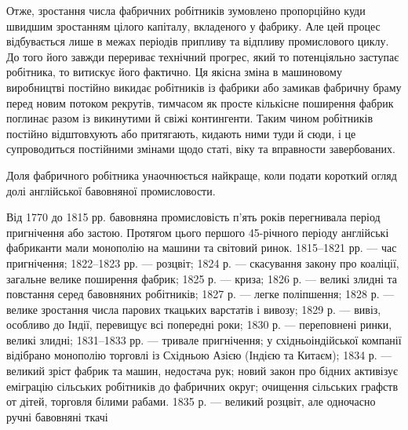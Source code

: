 Отже, зростання числа фабричних робітників зумовлено пропорційно
куди швидшим зростанням цілого капіталу, вкладеного
у фабрику. Але цей процес відбувається лише в межах періодів
припливу та відпливу промислового циклу. До того його завжди
перериває технічний прогрес, який то потенціяльно заступає робітника,
то витискує його фактично. Ця якісна зміна в машиновому
виробництві постійно викидає робітників із фабрики або замикав
фабричну браму перед новим потоком рекрутів, тимчасом як
просте кількісне поширення фабрик поглинає разом із викинутими
й свіжі контингенти. Таким чином робітників постійно відштовхують
або притягають, кидають ними туди й сюди, і це
супроводиться постійними змінами щодо статі, віку та вправности
завербованих.

Доля фабричного робітника унаочнюється найкраще, коли
подати короткий огляд долі англійської бавовняної промисловости.

Від 1770 до 1815 рр. бавовняна промисловість п’ять років перегнивала
період пригнічення або застою. Протягом цього першого
45-річного періоду англійські фабриканти мали монополію на
машини та світовий ринок. 1815--1821 рр. — час пригнічення;
1822--1823 рр. — розцвіт; 1824 р. — скасування закону про коаліції,
загальне велике поширення фабрик; 1825 р. — криза;
1826 р. — великі злидні та повстання серед бавовняних робітників;
1827 р. — легке поліпшення; 1828 р. — велике зростання
числа парових ткацьких варстатів і вивозу; 1829 р. — вивіз,
особливо до Індії, перевищує всі попередні роки; 1830 р. —
переповнені ринки, великі злидні; 1831--1833 рр. — тривале
пригнічення; у східньоіндійської компанії відібрано монополію
торговлі із Східньою Азією (Індією та Китаєм); 1834 р. — великий
зріст фабрик та машин, недостача рук; новий закон про бідних
активізує еміграцію сільських робітників до фабричних округ;
очищення сільських графств от дітей, торговля білими рабами.
1835 р. — великий розцвіт, але одночасно ручні бавовняні ткачі
\parbreak{}  %
